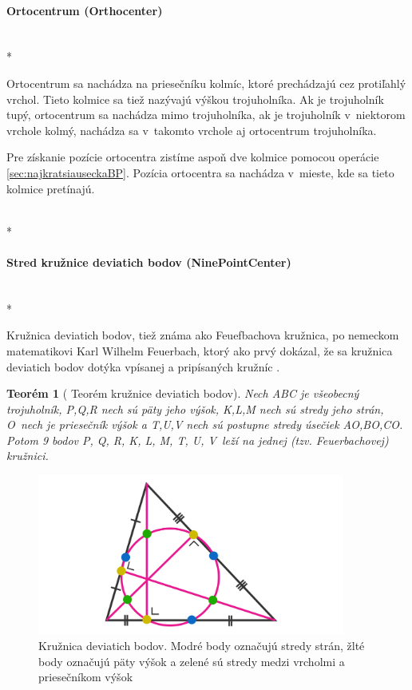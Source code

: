 \paragraph{Ortocentrum (Orthocenter)}\unskip \mbox{} \\*

Ortocentrum sa nachádza na priesečníku kolmíc, ktoré prechádzajú cez protiľahlý vrchol. Tieto kolmice sa tiež nazývajú výškou trojuholníka. 
Ak je trojuholník tupý, ortocentrum sa nachádza mimo trojuholníka, ak je trojuholník v~niektorom vrchole kolmý, nachádza sa v~takomto vrchole aj ortocentrum trojuholníka.

Pre získanie pozície ortocentra zistíme aspoň dve kolmice pomocou operácie \ref{sec:najkratsiauseckaBP}. Pozícia ortocentra sa nachádza v~mieste, kde sa tieto kolmice pretínajú. 


 \mbox{} \\*
\paragraph{Stred kružnice deviatich bodov (NinePointCenter)}\unskip \mbox{} \\*

Kružnica deviatich bodov, tiež známa ako Feuefbachova kružnica, po nemeckom matematikovi Karl Wilhelm Feuerbach, ktorý ako prvý dokázal, že sa kružnica deviatich bodov dotýka vpísanej a pripísaných kružníc \cite{NinePointTheorem}.


\newtheorem{theorem}{Teorém}
 
\begin{theorem}[{\cite{vyznamne_prvky_trojuholnika} Teorém kružnice deviatich bodov}]
Nech ABC je všeobecný trojuholník, P,Q,R nech sú päty jeho výšok, K,L,M nech sú stredy jeho strán, O~nech je priesečník výšok a T,U,V nech sú postupne stredy úsečiek AO,BO,CO. Potom 9 bodov P, Q, R, K, L, M, T, U, V~leží na jednej (tzv. Feuerbachovej) kružnici. 

\end{theorem}


\begin{figure}[H]
	\centering
	\includegraphics[width=0.9\textwidth]{obrazky-figures/NinePointCircle.png}
	\caption{Kružnica deviatich bodov. Modré body označujú stredy strán, žlté body označujú päty výšok a zelené sú stredy medzi vrcholmi a priesečníkom výšok\cite{katz_prakash_khim}}
	\label{fig:TriangleCenters_ninePoints}
\end{figure}



